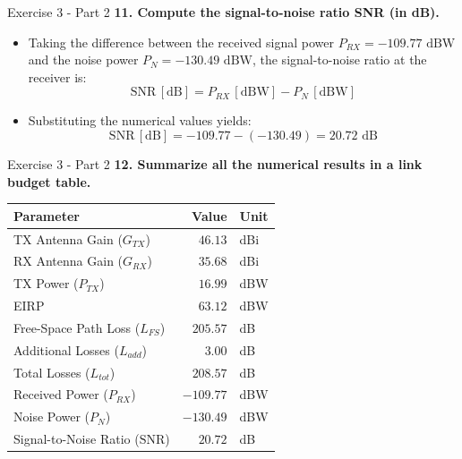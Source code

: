 \documentclass[10pt, aspectratio=169]{beamer}
\newcommand{\question}[1]{{\color{QuestionRed}\textbf{#1}}}
\begin{document}
	\begin{frame}{Exercise 3 - Part 2}
		\question{11. Compute the signal-to-noise ratio SNR (in dB).}
		
		\vspace{0.1cm}
		\begin{itemize}
			\item Taking the difference between the received signal power $P_{RX} = -109.77\text{ dBW}$ and the noise power $P_N = -130.49\text{ dBW}$, the signal-to-noise ratio at the receiver is:
			\[
			\text{SNR}\,[\text{dB}] = P_{RX}\,[\text{dBW}] - P_N\,[\text{dBW}]
			\]
			\item Substituting the numerical values yields:
			\[
			\text{SNR}\,[\text{dB}] = -109.77 - (-130.49) = 20.72\text{ dB}
			\]
		\end{itemize}
		
	\end{frame}
	
	\begin{frame}{Exercise 3 - Part 2}
		\question{12. Summarize all the numerical results in a link budget table.}
		
		\vspace{0.2cm}
		\begin{center}
			\small
			\begin{tabular}{l r l}
				\hline
				Parameter & Value & Unit \\
				\hline
				TX Antenna Gain ($G_{TX}$) & $46.13$ & dBi \\
				RX Antenna Gain ($G_{RX}$) & $35.68$ & dBi \\
				TX Power ($P_{TX}$) & $16.99$ & dBW \\
				EIRP & $63.12$ & dBW \\
				Free-Space Path Loss ($L_{FS}$) & $205.57$ & dB \\
				Additional Losses ($L_{add}$) & $3.00$ & dB \\
				Total Losses ($L_{tot}$) & $208.57$ & dB \\
				Received Power ($P_{RX}$) & $-109.77$ & dBW \\
				Noise Power ($P_N$) & $-130.49$ & dBW \\
				\hline
				Signal-to-Noise Ratio ($\text{SNR}$) & $20.72$ & dB \\
				\hline
			\end{tabular}
		\end{center}
		
	\end{frame}
	
\end{document}
